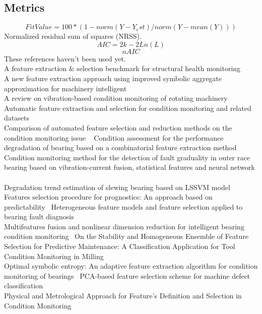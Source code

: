 \documentclass[]{article}
\begin{document}
\subsection{Metrics}
$$ FitValue = 100 * (1-norm(Y-Y_est)/norm(Y-mean(Y))) $$
Normalized residual sum of squares (NRSS).
$$ AIC = 2k - 2Ln(L) $$  
$$ nAIC $$
These references haven't been used yet.\\
A feature extraction \& selection benchmark for structural health monitoring ~\cite{buckley2023feature}\\
A new feature extraction approach using improved symbolic aggregate approximation for machinery intelligent ~\cite{zhang2019new}\\
A review on vibration-based condition monitoring of rotating machinery ~\cite{tiboni2022review}\\
Automatic feature extraction and selection for condition monitoring and related datasets ~\cite{schneider2018automatic}\\
Comparison of automated feature selection and reduction methods on the condition monitoring issue ~\cite{de2018comparison}
Condition assessment for the performance degradation of bearing based on a combinatorial feature extraction method ~\cite{hong2014condition}\\
Condition monitoring method for the detection of fault graduality in outer race bearing based on vibration-current fusion, statistical features and neural network ~\cite{saucedo2021condition}\\
Degradation trend estimation of slewing bearing based on LSSVM model~\cite{lu2016degradation}\\
Features selection procedure for prognostics: An approach based on predictability~\cite{javed2012features}
Heterogeneous feature models and feature selection applied to bearing fault diagnosis~\cite{rauber2014heterogeneous}\\
Multifeatures fusion and nonlinear dimension reduction for intelligent bearing condition monitoring~\cite{guo2016multifeatures}
On the Stability and Homogeneous Ensemble of Feature Selection for Predictive Maintenance: A Classification Application for Tool Condition Monitoring in Milling~\cite{assafo2023stability}\\
Optimal symbolic entropy: An adaptive feature extraction algorithm for condition monitoring of bearings~\cite{li2023optimal}
PCA-based feature selection scheme for machine defect classification~\cite{malhi2004pca}\\
Physical and Metrological Approach for Feature’s Definition and Selection in Condition Monitoring~\cite{d2019physical}
\clearpage  
\end{document}
